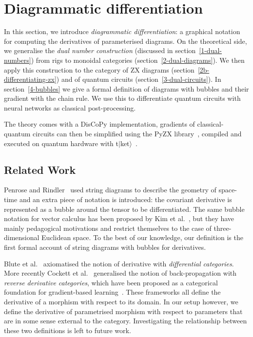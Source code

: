 
\section{Diagrammatic differentiation}

In this section, we introduce \emph{diagrammatic differentiation}: a graphical notation for computing the derivatives of parameterised diagrams.
On the theoretical side, we generalise the \emph{dual number construction} (discussed in section~\ref{1-dual-numbers}) from rigs to monoidal categories (section~\ref{2-dual-diagrams}).
We then apply this construction to the category of ZX diagrams (section~\ref{2b-differentiating-zx}) and of quantum circuits (section~\ref{3-dual-circuits}).
In section~\ref{4-bubbles} we give a formal definition of diagrams with bubbles and their gradient with the chain rule.
We use this to differentiate quantum circuits with neural networks as classical post-processing.

The theory comes with a DisCoPy implementation, gradients of classical-quantum circuits can then
be simplified using the PyZX library~\cite{KissingerVanDeWetering19}, compiled and executed
on quantum hardware with t$\vert$ket$\rangle$~\cite{SivarajahEtAl20}.

\subsection*{Related Work}

Penrose and Rindler~\cite{PenroseRindler84} used string diagrams to describe the geometry of space-time and an extra piece of notation is introduced: the covariant derivative is represented as a bubble around the tensor to be differentiated.
The same bubble notation for vector calculus has been proposed by Kim et al.~\cite{KimEtAl20}, but they have mainly pedagogical motivations and restrict themselves to the case of three-dimensional Euclidean space.
To the best of our knowledge, our definition is the first formal account of string diagrams with bubbles for derivatives.

Blute et al.~\cite{BluteEtAl06} axiomatised the notion of derivative with \emph{differential categories}.
More recently Cockett et al.~\cite{CockettEtAl19} generalised the notion of back-propagation with \emph{reverse derivative categories}, which have been proposed as a categorical foundation for gradient-based learning~\cite{CruttwellEtAl21}.
These frameworks all define the derivative of a morphism with respect to its domain.
In our setup however, we define the derivative of parametrised morphism with respect to parameters that are in some sense external to the category.
Investigating the relationship between these two definitions is left to future work.

